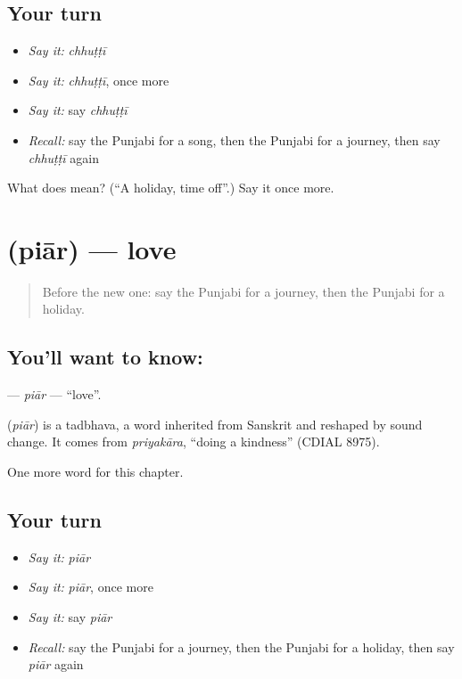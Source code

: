 \subsection*{Your turn}
\begin{itemize}
\raggedright
  \item \emph{Say it:} \emph{chhuṭṭī}
  \item \emph{Say it:} \emph{chhuṭṭī}, once more
  \item \emph{Say it:} say \emph{chhuṭṭī}
  \item \emph{Recall:} say the Punjabi for a song, then the Punjabi for a journey, then say \emph{chhuṭṭī} again
\end{itemize}

\begin{tcolorbox}[breakable,colback=teal!4,colframe=teal!35!black,title={Before you move on}]
What does  mean? (\textquotedblleft{}A holiday, time off\textquotedblright{}.) Say it once more.
\end{tcolorbox}
\section[\texorpdfstring{\pa{ਪਿਆਰ} (piār)}{ਪਿਆਰ (piār)}]{ (piār) — love}

\label{lesson:PA-C98-piar}



\begin{quote}
Before the new one: say the Punjabi for a journey, then the Punjabi for a holiday.
\end{quote}

\subsection*{You'll want to know: }
\textbf{} — \emph{piār} — \textquotedblleft{}love\textquotedblright{}.

\begin{cousinweb}
\textbf{} (\emph{piār}) is a tadbhava, a word inherited from Sanskrit and reshaped by sound change. It comes from \emph{priyakāra}, \textquotedblleft{}doing a kindness\textquotedblright{} (CDIAL 8975).
\end{cousinweb}

\begin{grammarlens}[title={What you've built}]
One more word for this chapter.
\end{grammarlens}

\subsection*{Your turn}
\begin{itemize}
\raggedright
  \item \emph{Say it:} \emph{piār}
  \item \emph{Say it:} \emph{piār}, once more
  \item \emph{Say it:} say \emph{piār}
  \item \emph{Recall:} say the Punjabi for a journey, then the Punjabi for a holiday, then say \emph{piār} again
\end{itemize}

